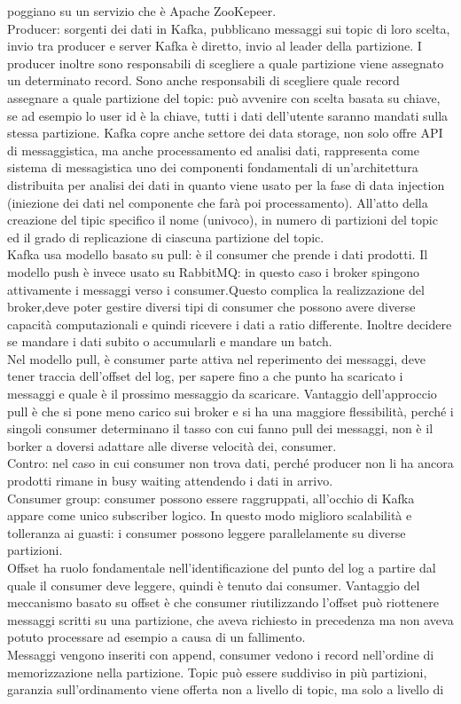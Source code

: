 \documentclass[16px]{article}
\begin{document}
poggiano su un servizio che è Apache ZooKepeer.\\ Producer: sorgenti dei dati in Kafka, pubblicano messaggi sui topic di loro scelta, invio tra producer e server Kafka è diretto, invio al leader della partizione. I producer inoltre sono responsabili di scegliere a quale partizione viene assegnato un determinato record. Sono anche responsabili di scegliere quale record assegnare a quale partizione del topic: può avvenire con scelta basata su chiave, se ad esempio lo user id è la chiave, tutti i dati dell'utente saranno mandati sulla stessa partizione.
Kafka copre anche settore dei data storage, non solo offre API di messaggistica, ma anche processamento ed analisi dati, rappresenta come sistema di messagistica uno dei componenti fondamentali di un'architettura distribuita per analisi dei dati in quanto viene usato per la fase di data injection (iniezione dei dati nel componente che farà poi processamento). All'atto della creazione del tipic specifico il nome (univoco), in numero di partizioni del topic ed il grado di replicazione di ciascuna partizione del topic.\\ Kafka usa modello basato su pull: è il consumer che prende i dati prodotti. Il modello push è invece usato su RabbitMQ: in questo caso i broker spingono attivamente i messaggi verso i consumer.Questo complica la realizzazione del broker,deve poter gestire diversi tipi di consumer che possono avere diverse capacità computazionali e quindi ricevere i dati a ratio differente. Inoltre decidere se mandare i dati subito o accumularli e mandare un batch.\\ Nel modello pull, è consumer parte attiva nel reperimento dei messaggi, deve tener traccia dell'offset del log, per sapere fino a che punto ha scaricato i messaggi e quale è il prossimo messaggio da scaricare. Vantaggio dell'approccio pull è che si pone meno carico sui broker e si ha una maggiore flessibilità, perché i singoli consumer determinano il tasso con cui fanno pull dei messaggi, non è il borker a doversi adattare alle diverse velocità dei, consumer. \\ Contro: nel caso in cui consumer non trova dati, perché producer non li ha ancora prodotti rimane in busy waiting attendendo i dati in arrivo.\\ Consumer group: consumer possono essere raggruppati, all'occhio di Kafka appare come unico subscriber logico. In questo modo miglioro scalabilità e tolleranza ai guasti: i consumer possono leggere parallelamente su diverse partizioni.\\ Offset ha ruolo fondamentale nell'identificazione del punto del log a partire dal quale il consumer deve leggere, quindi è tenuto dai consumer. Vantaggio del meccanismo basato su offset è che consumer riutilizzando l'offset può riottenere messaggi scritti su una partizione, che aveva richiesto in precedenza ma non aveva potuto processare ad esempio a causa di un fallimento.\\ Messaggi vengono inseriti con append, consumer vedono i record nell'ordine di memorizzazione nella partizione. Topic può essere suddiviso in più partizioni, garanzia sull'ordinamento viene offerta non a livello di topic, ma solo a livello di 
\end{document}
